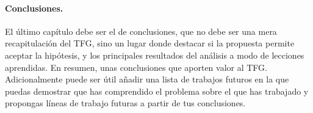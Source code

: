 \paragraph{Conclusiones.} El último capítulo debe ser el de conclusiones, que no debe ser una mera recapitulación del TFG, sino un lugar donde destacar si la propuesta permite aceptar la hipótesis, y los principales resultados del análisis a modo de lecciones aprendidas. En resumen, unas conclusiones que aporten valor al TFG. Adicionalmente puede ser útil añadir una lista de trabajos futuros en la que puedas demostrar que has comprendido el problema sobre el que has trabajado y propongas líneas de trabajo futuras a partir de tus conclusiones.




